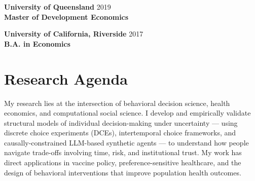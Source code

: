 \documentclass[11pt, letterpaper]{article}
\begin{document}
\vspace{0.5em}
\noindent \textbf{University of Queensland} \hfill 2019 \\
\textbf{Master of Development Economics}

\vspace{0.5em}
\noindent \textbf{University of California, Riverside} \hfill 2017 \\
\textbf{B.A. in Economics}

\section*{Research Agenda}
\vspace{0.3em}
My research lies at the intersection of behavioral decision science, health economics, and computational social science. I develop and empirically validate structural models of individual decision-making under uncertainty --- using discrete choice experiments (DCEs), intertemporal choice frameworks, and causally-constrained LLM-based synthetic agents --- to understand how people navigate trade-offs involving time, risk, and institutional trust. My work has direct applications in vaccine policy, preference-sensitive healthcare, and the design of behavioral interventions that improve population health outcomes.
\end{document}
